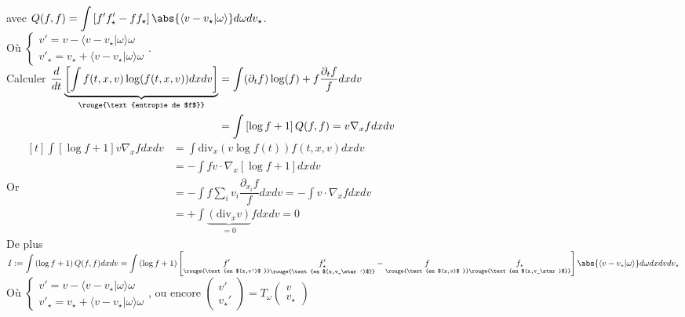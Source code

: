\documentclass[12pt,a4paper]{article}
\begin{document}
	avec $Q(f,f) = \displaystyle\int \left[f'f'_\star - ff_\star\right]\abs{\langle v-v_\star|\omega\rangle}d\omega dv_\star$.\\
	Où $\begin{cases}
		v' = v-\langle v-v_\star |\omega\rangle\omega \\
		v'_\star = v_\star + \langle v-v_\star |\omega\rangle\omega
	\end{cases}$.\\
	Calculer $\begin{aligned}[t]
		\dfrac d{dt} \underbrace{\left[\displaystyle\int f(t,x,v)\log(f(t,x,v))dxdv\right]}_{\rouge{\text{entropie de $f$}}} 
		&= \int (\partial_t f)\log(f) + f \dfrac{\partial_t f}{f}dxdv\\
		&= \int \left[\log f + 1\right]Q(f,f) = v\nabla_x f dxdv
	\end{aligned}$\\
	Or $\begin{aligned}[t]
	\displaystyle\int \left[\log f + 1\right]v\nabla_x f dx dv 
	&= \int \text{div}_x\left(v\log f(t)\right)f(t,x,v)dxdv \\
	&= - \int fv\cdot\nabla_x\left[\log f +1\right]dxdv \\
	&= - \int f\sum_i v_i \dfrac{\partial_{x_i} f}{f} dxdv = -\int v\cdot \nabla_x f dxdv\\
	&= + \int \underbrace{\left(\text{div}_x v\right)}_{=0} f dxdv = 0 
	\end{aligned}$
	\\
	De plus $I := \displaystyle\int \left(\log f +1\right)Q(f,f)dxdv = \int \left(\log f +1\right)\left[\underset{\rouge{\text{en $(x,v')$ }}}{f'}\underset{\rouge{\text{en $(x,v_\star')$}}}{f_\star'}-\underset{\rouge{\text{en $(x,v)$ }}}f\underset{\rouge{\text{en $(x,v_\star)$}}}{f_\star}\right]\abs{\langle v-v_\star|\omega\rangle}d\omega dx dv dv_\star$\\
	
	Où $\begin{cases}
		v' = v-\langle v-v_\star|\omega\rangle\omega\\
		v'_\star = v_\star + \langle v-v_\star|\omega\rangle\omega
	\end{cases}$, ou encore $\begin{pmatrix}
	v' \\ v_\star'
	\end{pmatrix} = T_\omega\begin{pmatrix}
	v \\ v_\star
	\end{pmatrix}$\\
	
\end{document}
